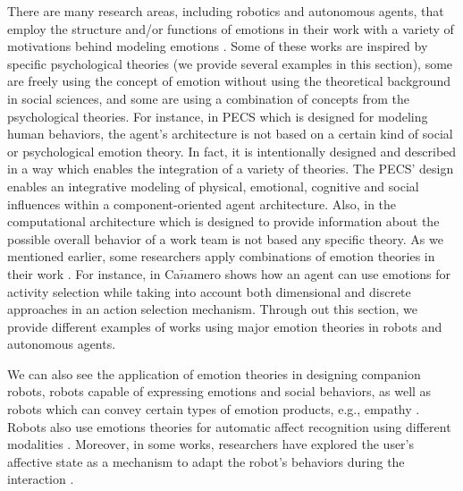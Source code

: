 \documentclass[12pt]{report}
\begin{document}
There are many research areas, including robotics and autonomous agents, that
employ the structure and/or functions of emotions in their work with a variety
of motivations behind modeling emotions
\cite{wehrle:motivations-modeling-emotion}. Some of these works are inspired by
specific psychological theories (we provide several examples in this section),
some are freely using the concept of emotion without using the theoretical
background in social sciences, and some are using a combination of concepts from
the psychological theories. For instance, in PECS \cite{urban:pecs} which is
designed for modeling human behaviors, the agent's architecture is not based on
a certain kind of social or psychological emotion theory. In fact, it is
intentionally designed and described in a way which enables the integration of a
variety of theories. The PECS' design enables an integrative modeling of
physical, emotional, cognitive and social influences within a component-oriented
agent architecture. Also, in \cite{miranda:teamwork-multiagent-system} the
computational architecture which is designed to provide information about the
possible overall behavior of a work team is not based any specific theory. As
we mentioned earlier, some researchers apply combinations of emotion theories in
their work \cite{kiryazov:modeling-appraisal-pad}. For instance, in
\cite{canamero:designing-activity-selection} Ca$\tilde{n}$amero shows how an
agent can use emotions for activity selection while taking into account both
dimensional and discrete approaches in an action selection mechanism. Through
out this section, we provide different examples of works using major emotion
theories in robots and autonomous agents.

We can also see the application of emotion theories in designing companion
robots, robots capable of expressing emotions and social behaviors, as well
as robots which can convey certain types of emotion products, e.g., empathy
\cite{breazeal:expressive-behavior} \cite{leite:empathy-hri}
\cite{paiva:emotion-modeling} \cite{shayganfar:methodology}. Robots also use
emotions theories for automatic affect recognition using different modalities
\cite{hegel:empathic-robot} \cite{zeng:affect-recognition}. Moreover, in some
works, researchers have explored the user’s affective state as a mechanism to
adapt the robot's behaviors during the interaction
\cite{breazeal:sociable-robot} \cite{liu:affect-robot-behavior}.\\
\end{document}
